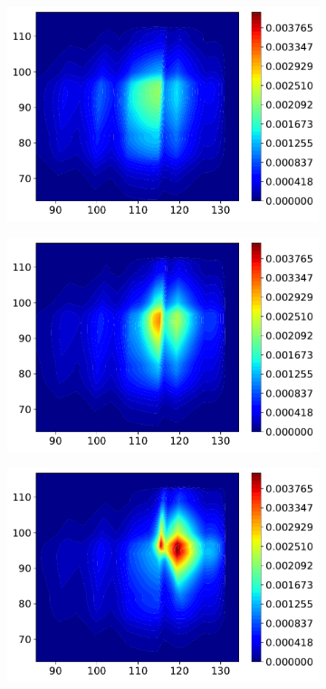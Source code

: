 \documentclass{article} %
\theoremstyle{definition}
\theoremstyle{plain}
\begin{document}
\begin{figure}
\vspace{-0.1cm}
 \centering
\begin{subfigure}{0.25\textwidth}
  \centering
  \includegraphics[width=1\linewidth]{figures/plot_real_stage1.pdf}
\end{subfigure}%
\begin{subfigure}{0.25\textwidth}
  \centering
  \includegraphics[width=1\linewidth]{figures/plot_real_stage2_upper_gamma2.pdf}
\end{subfigure}
\begin{subfigure}{0.25\textwidth}
  \centering
  \includegraphics[width=1\linewidth]{figures/plot_real_stage2_upper_gamma4.pdf}

\end{subfigure}
\end{figure}
\end{document}
